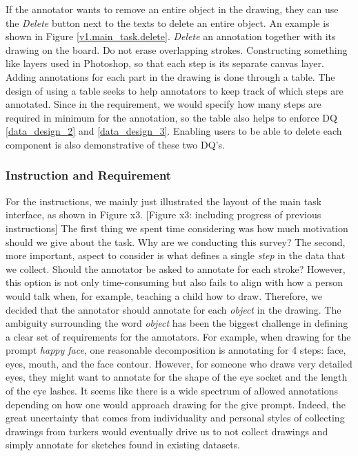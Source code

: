 If the annotator wants to remove an entire object in the drawing, they can use the \textit{Delete} button next to the texts to delete an entire object. An example is shown in Figure \ref{v1.main_task.delete}. \textit{Delete} an annotation together with its drawing on the board. Do not erase overlapping strokes. Constructing something like layers used in Photoshop, so that each step is its separate canvas layer. 
Adding annotations for each part in the drawing is done through a table. The design of using a table seeks to help annotators to keep track of which steps are annotated. Since in the requirement, we would specify how many steps are required in minimum for the annotation, so the table also helps to enforce DQ \ref{data_design_2} and \ref{data_design_3}. Enabling users to be able to delete each component is also demonstrative of these two DQ's. 



\subsubsection{Instruction and Requirement}
For the instructions, we mainly just illustrated the layout of the main task interface, as shown in Figure x3.
[Figure x3: including progress of previous instructions]
The first thing we spent time considering was how much motivation should we give about the task. Why are we conducting this survey? The second, more important, aspect to consider is what defines a single \textit{step} in the data that we collect. Should the annotator be asked to annotate for each stroke? However, this option is not only time-consuming but also fails to align with how a person would talk when, for example, teaching a child how to draw. Therefore, we decided that the annotator should annotate for each \textit{object} in the drawing. The ambiguity surrounding the word \textit{object} has been the biggest challenge in defining a clear set of requirements for the annotators. For example, when drawing for the prompt \textit{happy face}, one reasonable decomposition is annotating for 4 steps: face, eyes, mouth, and the face contour. However, for someone who draws very detailed eyes, they might want to annotate for the shape of the eye socket and the length of the eye lashes. It seems like there is a wide spectrum of allowed annotations depending on how one would approach drawing for the give prompt. Indeed, the great uncertainty that comes from individuality and personal styles of collecting drawings from turkers would eventually drive us to not collect drawings and simply annotate for sketches found in existing datasets.                    

